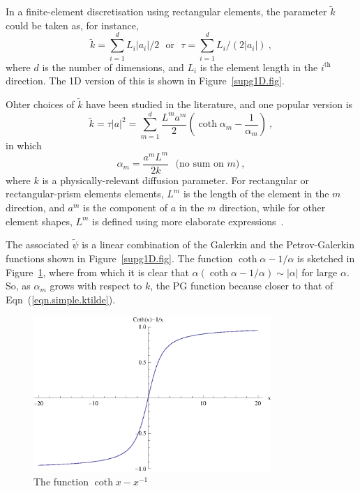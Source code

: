 \documentclass[]{scrreprt}
\begin{document}
In a finite-element discretisation using rectangular elements, the
parameter $\tilde{k}$ could be taken as, for instance,
\begin{equation}
\tilde{k} = \sum_{i=1}^{d} L_{i} |a_{i}|/2 \ \ \ \mbox{or}\ \ \
\tau = \sum_{i=1}^{d}L_{i}/(2|a_{i}|) \ ,
\label{eqn.simple.ktilde}
\end{equation}
where $d$ is the number of dimensions, and $L_{i}$ is the element
length in the $i^{\mathrm{th}}$ direction.  The 1D version of this is
shown in Figure~\ref{supg1D.fig}.

Ohter choices of $\tilde{k}$
have been studied in the literature, and one popular version is
\begin{equation}
\tilde{k} = \tau |a|^{2} = \sum_{m=1}^{d} \frac{L^{m}a^{m}}{2} \left(
\coth\alpha_{m} - \frac{1}{\alpha_{m}} \right)\ ,
\label{complicated.ktilde.eqn}
\end{equation}
in which
\begin{equation}
\alpha_{m} = \frac{a^{m}L^{m}}{2k} \ \ \ \mbox{(no sum on $m$)} \ ,
\end{equation}
where $k$ is a physically-relevant
diffusion parameter.  For rectangular or rectangular-prism elements
elements, $L^{m}$ is the length of the element in the $m$ direction,
and $a^{m}$ is the component of $a$ in the $m$ direction, while for
other element shapes, $L^{m}$ is defined using more elaborate expressions~\cite{brooks1982}.

The associated
$\tilde{\psi}$ is a linear combination of the Galerkin and the
Petrov-Galerkin functions shown in Figure~\ref{supg1D.fig}.  The function
$\coth\alpha - 1/\alpha$ is sketched in Figure~\ref{coth.fig}, where
from which it is clear that $\alpha(\coth\alpha - 1/\alpha) \sim
|\alpha|$ for large $\alpha$.  So, as $\alpha_{m}$ grows with respect to
$k$, the PG function because closer to that of Eqn~(\ref{eqn.simple.ktilde}).

\begin{figure}[htb]
\centering
\includegraphics[width=9cm]{coth.eps}
\caption{The function $\coth x - x^{-1}$}
\label{coth.fig}
\end{figure}
\end{document}
